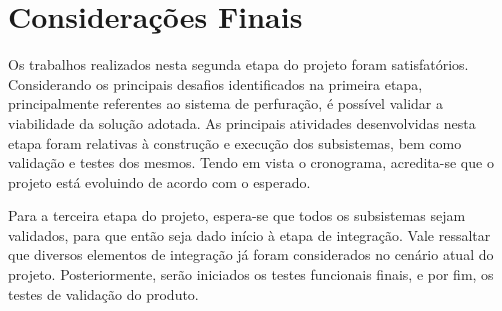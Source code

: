 \chapter{Considerações Finais}
Os trabalhos realizados nesta segunda etapa do projeto foram satisfatórios.
Considerando os principais desafios identificados na primeira etapa, principalmente
referentes ao sistema de perfuração, é possível validar a viabilidade da solução adotada.
As principais atividades desenvolvidas nesta etapa foram relativas à construção e
execução dos subsistemas, bem como validação e testes dos mesmos. Tendo em vista
o cronograma, acredita-se que o projeto está evoluindo de acordo com o esperado. 

Para a terceira etapa do projeto, espera-se que todos os subsistemas
sejam validados, para que então seja dado início à etapa de integração.
Vale ressaltar que diversos elementos de integração já foram considerados
no cenário atual do projeto. Posteriormente, serão iniciados os testes
funcionais finais, e por fim, os testes de validação do produto.
